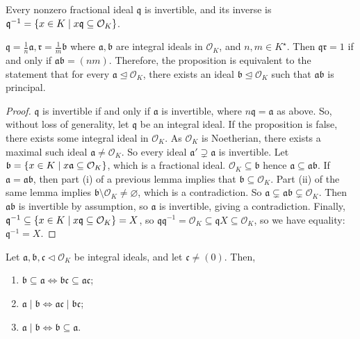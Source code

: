 \begin{proposition}
    Every nonzero fractional ideal \( \mathfrak q \) is invertible, and its inverse is \( \mathfrak q^{-1} = \qty{x \in K \mid x\mathfrak q \subseteq \mathcal O_K} \).
\end{proposition}
\begin{remark}
    \( \mathfrak q = \frac{1}{n} \mathfrak a, \mathfrak r = \frac{1}{m} \mathfrak b \) where \( \mathfrak a, \mathfrak b \) are integral ideals in \( \mathcal O_K \), and \( n, m \in K^\star \).
    Then \( \mathfrak q\mathfrak r = 1 \) if and only if \( \mathfrak a \mathfrak b = (nm) \).
    Therefore, the proposition is equivalent to the statement that for every \( \mathfrak a \trianglelefteq \mathcal O_K \), there exists an ideal \( \mathfrak b \trianglelefteq \mathcal O_K \) such that \( \mathfrak a \mathfrak b \) is principal.
\end{remark}
\begin{proof}
    \( \mathfrak q \) is invertible if and only if \( \mathfrak a \) is invertible, where \( n\mathfrak q = \mathfrak a \) as above.
    So, without loss of generality, let \( \mathfrak q \) be an integral ideal.
    If the proposition is false, there exists some integral ideal in \( \mathcal O_K \).
    As \( \mathcal O_K \) is Noetherian, there exists a maximal such ideal \( \mathfrak a \neq \mathcal O_K \).
    So every ideal \( \mathfrak a' \supsetneq \mathfrak a \) is invertible.
    Let \( \mathfrak b = \qty{x \in K \mid x\mathfrak a \subseteq \mathcal O_K} \), which is a fractional ideal.
    \( \mathcal O_K \subseteq \mathfrak b \) hence \( \mathfrak a \subseteq \mathfrak a \mathfrak b \).
    If \( \mathfrak a = \mathfrak a \mathfrak b \), then part (i) of a previous lemma implies that \( \mathfrak b \subseteq \mathcal O_K \).
    Part (ii) of the same lemma implies \( \mathfrak b \setminus \mathcal O_K \neq \varnothing \), which is a contradiction.
    So \( \mathfrak a \subsetneq \mathfrak a \mathfrak b \subsetneq \mathcal O_K \).
    Then \( \mathfrak a \mathfrak b \) is invertible by assumption, so \( \mathfrak a \) is invertible, giving a contradiction.
    Finally, \( \mathfrak q^{-1} \subseteq \qty{x \in K \mid x\mathfrak q \subseteq \mathcal O_K} = X \), so \( \mathfrak q \mathfrak q^{-1} = \mathcal O_K \subseteq \mathfrak q X \subseteq \mathcal O_K \), so we have equality: \( \mathfrak q^{-1} = X \).
\end{proof}
\begin{corollary}
    Let \( \mathfrak a, \mathfrak b, \mathfrak c \triangleleft \mathcal O_K \) be integral ideals, and let \( \mathfrak c \neq (0) \).
    Then,
    \begin{enumerate}
        \item \( \mathfrak b \subseteq \mathfrak a \iff \mathfrak b \mathfrak c \subseteq \mathfrak a \mathfrak c \);
        \item \( \mathfrak a \mid \mathfrak b \iff \mathfrak a \mathfrak c \mid \mathfrak b \mathfrak c \);
        \item \( \mathfrak a \mid \mathfrak b \iff \mathfrak b \subseteq \mathfrak a \).
    \end{enumerate}
\end{corollary}
